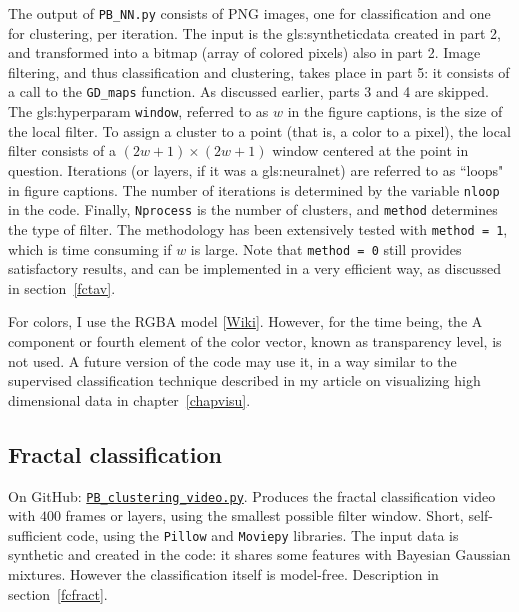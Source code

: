 \documentclass[oneside,10pt]{book}
\begin{document}
The output of  \texttt{PB\_NN.py} consists of PNG images, one for classification and one for clustering, per iteration. The input is the \gls{gls:syntheticdata} created in part 2, and transformed into a bitmap (array of colored pixels) also in part 2. Image filtering, and thus classification and clustering, takes place in part 5: it consists of a call to the \texttt{GD\_maps} function. As discussed earlier, parts 3 and 4 are skipped. The \gls{gls:hyperparam} \texttt{window}, referred to as $w$ in the figure captions, is the size of the local filter. To assign a cluster to a point (that is, a color to a pixel), the local filter consists of a $(2w+1)\times(2w+1)$ window centered at the point in question.
Iterations (or layers, if it was a \gls{gls:neuralnet}) are referred to as ``loops" in figure captions. The number of iterations
is determined by the variable \texttt{nloop} in the code. Finally, \texttt{Nprocess} is the number of clusters, and \texttt{method} determines the type of filter. The methodology has been extensively tested with \texttt{method = 1}, which is time consuming if
$w$ is large. Note that \texttt{method = 0} still provides satisfactory results, and can be implemented in a very efficient way,
as discussed in section~\ref{fctav}.

For colors, I use the \textcolor{index}{RGBA} model [\href{https://en.wikipedia.org/wiki/RGBA_color_model}{Wiki}]. However, for the time being, the A component or fourth element of the color vector, known as transparency level, is not used. A future version of the code may use it, in a way similar to the supervised classification technique described in my article on visualizing
high dimensional data in chapter~\ref{chapvisu}.

\subsection{Fractal classification}\label{pyfc1}

On GitHub: \href{https://github.com/VincentGranville/Point-Processes/blob/main/Videos/PB_clustering_video.py}{\texttt{PB\_clustering\_video.py}}. Produces the fractal classification video with $400$ frames or layers, using the smallest possible filter window. Short, self-sufficient code, using the \texttt{Pillow} and \texttt{Moviepy} libraries. The input data is synthetic and created in the code: it shares some features with Bayesian Gaussian mixtures. However the classification itself is model-free. Description in section~\ref{fcfract}.
\end{document}
